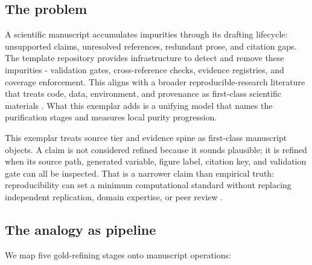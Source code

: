 \documentclass[
]{article}
\begin{document}
\subsection{The problem}\label{the-problem}

A scientific manuscript accumulates impurities through its drafting
lifecycle: unsupported claims, unresolved references, redundant prose,
and citation gaps. The template repository provides infrastructure to
detect and remove these impurities - validation gates, cross-reference
checks, evidence registries, and coverage enforcement. This aligns with
a broader reproducible-research literature that treats code, data,
environment, and provenance as first-class scientific materials
\citep{buckheit_donoho_1995, peng2011reproducible, stodden2011default, sandve2013ten}.
What this exemplar adds is a unifying model that names the purification
stages and measures local purity progression.

This exemplar treats source tier and evidence spine as first-class
manuscript objects. A claim is not considered refined because it sounds
plausible; it is refined when its source path, generated variable,
figure label, citation key, and validation gate can all be inspected.
That is a narrower claim than empirical truth: reproducibility can set a
minimum computational standard without replacing independent
replication, domain expertise, or peer review
\citep{peng2011reproducible, ioannidis2005false}.

\subsection{The analogy as pipeline}\label{the-analogy-as-pipeline}

We map five gold-refining stages onto manuscript operations:
\end{document}
